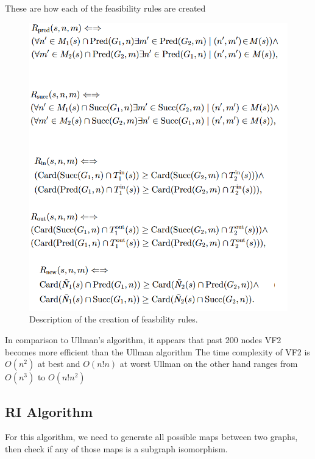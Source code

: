 \documentclass{article}
\begin{document}
  These are how each of the feasibility rules are created

  \begin{figure}[H]
    \centering
    \includegraphics{images/vf2_algo.png}
    \caption{Description of the creation of feasbility rules.}
    \label{fuckyou}
  \end{figure}

  In comparison to Ullman's algorithm, it appears that past 200 nodes VF2 becomes more efficient than the Ullman algorithm
  The time complexity of VF2 is $O(n^2)$ at best and $O(n!n)$ at worst
  Ullman on the other hand ranges from $O(n^3)$ to $O(n!n^2)$
  \cite{cordella}

  \subsection{RI Algorithm}

  For this algorithm, we need to generate all possible maps between two graphs, then check if any of those maps is a subgraph isomorphism.
\end{document}
